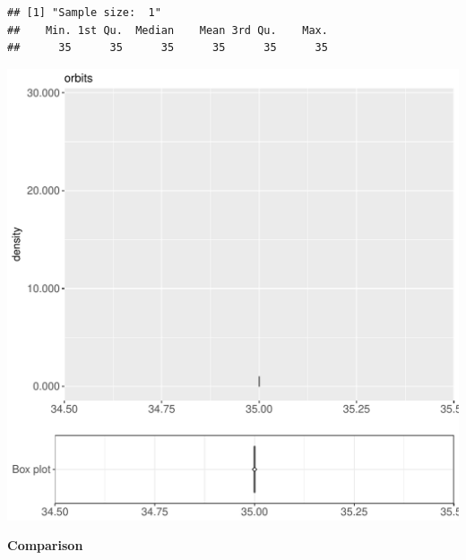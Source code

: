 \documentclass{article}\usepackage[]{graphicx}\usepackage[]{color}
\makeatletter
\def\maxwidth{ %
  \ifdim\Gin@nat@width>\linewidth
    \linewidth
  \else
    \Gin@nat@width
  \fi
}
\newenvironment{kframe}{%
 \def\at@end@of@kframe{}%
 \ifinner\ifhmode%
  \def\at@end@of@kframe{\end{minipage}}%
  \begin{minipage}{\columnwidth}%
 \fi\fi%
 \def\FrameCommand##1{\hskip\@totalleftmargin \hskip-\fboxsep
 \colorbox{shadecolor}{##1}\hskip-\fboxsep
     \hskip-\linewidth \hskip-\@totalleftmargin \hskip\columnwidth}%
 \MakeFramed {\advance\hsize-\width
   \@totalleftmargin\z@ \linewidth\hsize
   \@setminipage}}%
 {\par\unskip\endMakeFramed%
 \at@end@of@kframe}
\newenvironment{knitrout}{}{} %
\makeatother
\begin{document}
\begin{knitrout}
\color{fgcolor}\begin{kframe}
\begin{verbatim}
## [1] "Sample size:  1"
##    Min. 1st Qu.  Median    Mean 3rd Qu.    Max. 
##      35      35      35      35      35      35
\end{verbatim}


{\ttfamily\noindent\bfseries{}}\end{kframe}
\includegraphics[width=\maxwidth]{figure/RH8_cashewExceptRenameAlph_big-1} 

\end{knitrout}
  
 \textbf{Comparison}
  
\end{document}
